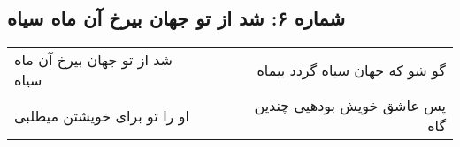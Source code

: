 \begin{center}
\section*{شماره ۶: شد از تو جهان بیرخ آن ماه سیاه}
\label{sec:006}
\begin{longtable}{l p{0.5cm} r}
شد از تو جهان بیرخ آن ماه سیاه
&&
گو شو که جهان سیاه گردد بیماه
\\
او را تو برای خویشتن میطلبی
&&
پس عاشق خویش بودهیی چندین گاه
\\
\end{longtable}
\end{center}
